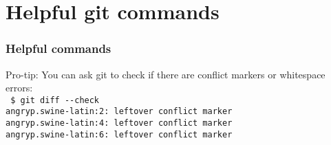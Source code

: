 \documentclass[t]{beamer}
\begin{document}

\section{Helpful git commands}
\begin{frame}
  \frametitle{Helpful commands}

  Pro-tip: You can ask git to check if there are conflict markers or
  whitespace errors:\\[0.25\baselineskip]
    {\scriptsize\texttt{%
    \$ git diff -{}-check\\
    angryp.swine-latin:2: leftover conflict marker\\
    angryp.swine-latin:4: leftover conflict marker\\
    angryp.swine-latin:6: leftover conflict marker\\
    }}

\end{frame}

\end{document}
